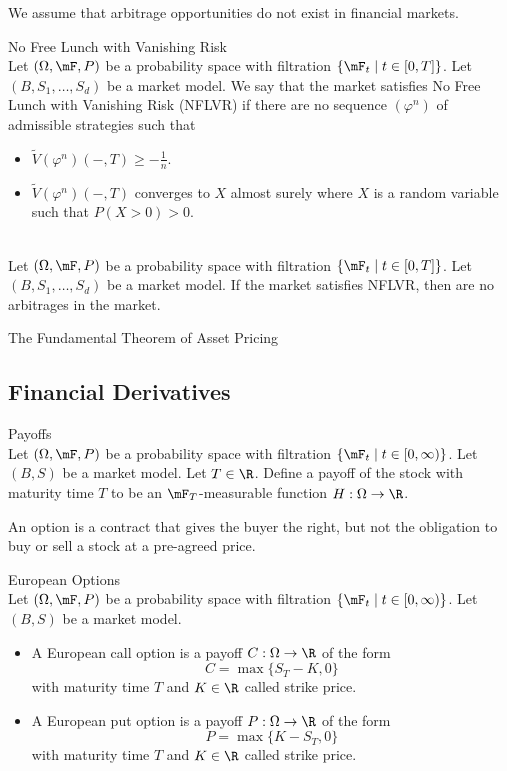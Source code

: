 \documentclass[a4paper]{article}
\begin{document}
We assume that arbitrage opportunities do not exist in financial markets. 

\begin{defn}{No Free Lunch with Vanishing Risk}{}\\
Let $(\Omega,\mF,P)$ be a probability space with filtration $\{\mF_t\;|\;t\in[0,T]\}$. Let $(B,S_1,\dots,S_d)$ be a market model. We say that the market satisfies No Free Lunch with Vanishing Risk (NFLVR) if there are no sequence $(\varphi^n)$ of admissible strategies such that 
\begin{itemize}
\item $\widetilde{V}(\varphi^n)(-,T)\geq-\frac{1}{n}$. 
\item $\widetilde{V}(\varphi^n)(-,T)$ converges to $X$ almost surely where $X$ is a random variable such that $P(X>0)>0$. 
\end{itemize}
\end{defn}

\begin{lmm}{}{}\\
Let $(\Omega,\mF,P)$ be a probability space with filtration $\{\mF_t\;|\;t\in[0,T]\}$. Let $(B,S_1,\dots,S_d)$ be a market model. If the market satisfies NFLVR, then are no arbitrages in the market. 
\end{lmm}

\begin{thm}{The Fundamental Theorem of Asset Pricing}{}\\

\end{thm}

\subsection{Financial Derivatives}
\begin{defn}{Payoffs}{}\\
Let $(\Omega,\mF,P)$ be a probability space with filtration $\{\mF_t\;|\;t\in[0,\infty)\}$. Let $(B,S)$ be a market model. Let $T\in\R$. Define a payoff of the stock with maturity time $T$ to be an $\mF_T$-measurable function $H:\Omega\to\R$. 
\end{defn}

An option is a contract that gives the buyer the right, but not the obligation to buy or sell a stock at a pre-agreed price. \\

\begin{defn}{European Options}{}\\
Let $(\Omega,\mF,P)$ be a probability space with filtration $\{\mF_t\;|\;t\in[0,\infty)\}$. Let $(B,S)$ be a market model. 
\begin{itemize}
\item A European call option is a payoff $C:\Omega\to\R$ of the form $$C=\max\{S_T-K,0\}$$ with maturity time $T$ and $K\in\R$ called strike price. 
\item A European put option is a payoff $P:\Omega\to\R$ of the form $$P=\max\{K-S_T,0\}$$ with maturity time $T$ and $K\in\R$ called strike price. 
\end{itemize}
\end{defn}
\end{document}
